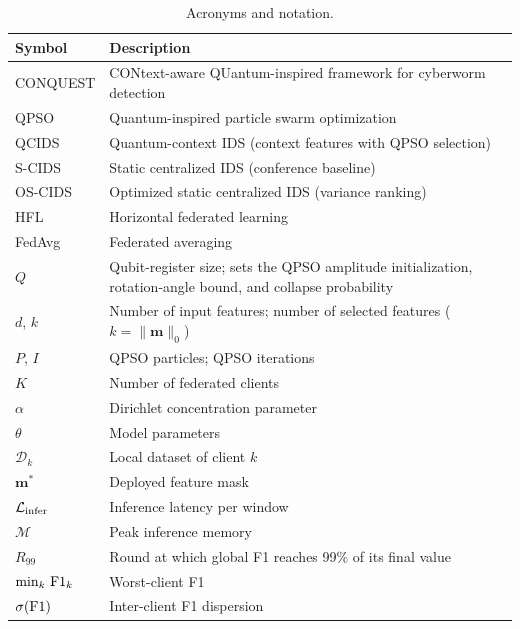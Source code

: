 \documentclass[conference]{IEEEtran}
\begin{document}
\begin{table}[!t]
\centering
\scriptsize
\caption{Acronyms and notation.}
\label{tab:acronyms_notations}
\setlength{\tabcolsep}{4pt}
\renewcommand{\arraystretch}{1.05}
\begin{tabular}{p{1.8cm} p{5.2cm}}
\hline\toprule
\textbf{Symbol} & \textbf{Description} \\
\hline\toprule
CONQUEST  & CONtext-aware QUantum-inspired framework for cyberworm detection \\
QPSO      & Quantum-inspired particle swarm optimization \\
QCIDS     & Quantum-context IDS (context features with QPSO selection) \\
S-CIDS    & Static centralized IDS (conference baseline) \\
OS-CIDS   & Optimized static centralized IDS (variance ranking) \\
HFL       & Horizontal federated learning \\
FedAvg    & Federated averaging \\
\midrule
$Q$                     & Qubit-register size; sets the
                          QPSO amplitude initialization, rotation-angle
                          bound, and collapse probability \\
$d$, $k$ & Number of input features; number
                          of selected features ($k=\|\mathbf{m}\|_0$) \\
$P$, $I$ & QPSO particles; QPSO iterations \\
$K$                     & Number of federated clients \\
$\alpha$                & Dirichlet concentration parameter \\
$\theta$                & Model parameters \\
$\mathcal{D}_k$         & Local dataset of client $k$ \\
$\mathbf{m}^{*}$        & Deployed feature mask \\
$\mathcal{L}_{\rm infer}$ & Inference latency per window \\
$\mathcal{M}$ & Peak inference memory \\
$R_{99}$                & Round at which global F1 reaches 99\% of its final value \\
$\min_k\,{\rm F1}_k$    & Worst-client F1 \\
$\sigma({\rm F1})$      & Inter-client F1 dispersion \\
\hline\toprule
\end{tabular}
\end{table}
\end{document}
